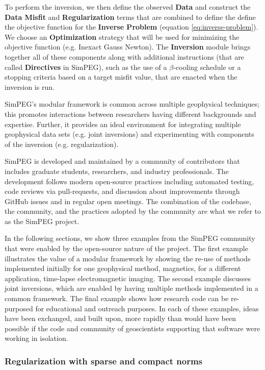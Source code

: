 To perform the inversion, we then define the observed \textbf{Data} and construct the \textbf{Data Misfit} and \textbf{Regularization} terms that are combined to define the define the objective function for the \textbf{Inverse Problem} (equation \ref{eq:inverse-problem}). We choose an \textbf{Optimization} strategy that will be used for minimizing the objective function (e.g. Inexact Gauss Newton). The \textbf{Inversion} module brings together all of these components along with additional instructions (that are called \textbf{Directives} in SimPEG), such as the use of a $\beta$-cooling schedule or a stopping criteria based on a target misfit value, that are enacted when the inversion is run.



SimPEG's modular framework is common across multiple geophysical techniques; this promotes interactions between researchers having different backgrounds and expertise. Further, it provides an ideal environment for integrating multiple geophysical data sets (e.g. joint inversions) and experimenting with components of the inversion (e.g. regularization).

SimPEG is developed and maintained by a community of contributors that includes graduate students, researchers, and industry professionals. The development follows modern open-source practices including automated testing, code reviews via pull-requests, and discussion about improvements through GitHub issues and in regular open meetings. The combination of the codebase, the community, and the practices adopted by the community are what we refer to as the SimPEG project.

In the following sections, we show three examples from the SimPEG community that were enabled by the open-source nature of the project. The first example illustrates the value of a modular framework by showing the re-use of methods implemented initially for one geophysical method, magnetics, for a different application, time-lapse electromagnetic imaging. The second example discusses joint inversions, which are enabled by having multiple methods implemented in a common framework. The final example shows how research code can be re-purposed for educational and outreach purposes. In each of these examples, ideas have been exchanged, and built upon, more rapidly than would have been possible if the code and community of geoscientists supporting that software were working in isolation.


\subsubsection{Regularization with sparse and compact norms}

